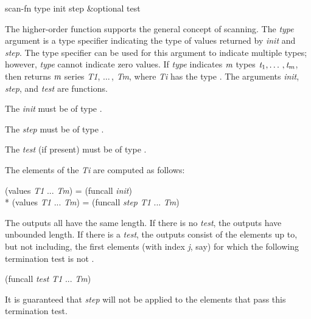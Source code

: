 \begin{defun}[Function]
scan-fn type init step &optional test

The higher-order function  supports the general concept of
scanning.  The \emph{type} argument is a type specifier indicating
the type of values returned by \emph{init} and \emph{step}.  The 
type specifier can be used for this argument
to indicate multiple types; however, \emph{type} cannot
indicate zero values.  If \emph{type} indicates $\emph{m}$ types
$\emph{t}_1, \ldots\,, \emph{t}_{m}$,
then  returns $\emph{m}$ series
\emph{T1}, $\ldots\,$, \emph{Tm}, where \emph{Ti} has
the type .
The arguments \emph{init}, \emph{step}, and \emph{test} are functions.

The \emph{init} must be of type 
.

The \emph{step} must be of type 
.

The \emph{test} (if present) must be of type 
.

The elements of the \emph{Ti} are computed as follows:
\begin{lisp}
(values \emph{T1} ... \emph{Tm}) = (funcall \emph{init}) \\*
(values \emph{T1} ... \emph{Tm}) = (funcall \emph{step} \emph{T1} ... \emph{Tm})
\end{lisp}

The outputs all have the same length.  If there is no \emph{test}, the
outputs have unbounded length.  If there is a \emph{test}, the outputs
consist of the elements up to, but not including, the first elements (with
index \emph{j}, say) for which the following termination test is not .
\begin{lisp}
(funcall \emph{test} \emph{T1} ... \emph{Tm})
\end{lisp}
It is guaranteed that \emph{step} will
not be applied to the elements that pass this termination test.


\end{defun}
